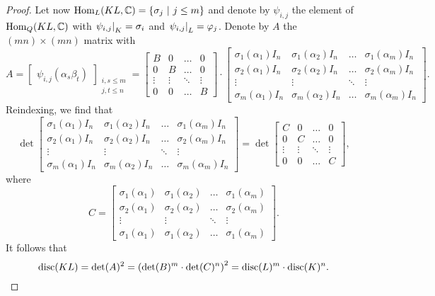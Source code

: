 \begin{proof}
Let now $\operatorname{Hom}_L(KL, \mathbb{C}) = \left\{\sigma_j~\middle\vert~j \leq m\right\}$ and denote
by $\psi_{i,j}$ the element of $\operatorname{Hom}_Q(KL, \mathbb{C})$ with
$\left. \psi_{i,j}\right|_{K}^{} = \sigma_i$ and
$\left. \psi_{i,j}\right|_{L}^{} = \varphi_j$. Denote by $A$ the
$(mn) \times (mn)$ matrix with
\[
A =
\begin{bmatrix}
\psi_{i,j}(\alpha_s \beta_t)
\end{bmatrix}_{\substack{i,s \leq m \\ j,t \leq n}}
=
\begin{bmatrix}
B & 0 & \dots & 0 \\
0 & B & \dots & 0 \\
\vdots & \vdots & \ddots & \vdots \\
0 & 0 & \dots & B
\end{bmatrix}
\cdot
\begin{bmatrix}
\sigma_1(\alpha_1) I_n & \sigma_1(\alpha_2) I_n &
\dots & \sigma_1(\alpha_m) I_n \\
\sigma_2(\alpha_1) I_n & \sigma_2(\alpha_2) I_n &
\dots & \sigma_2(\alpha_m) I_n \\
\vdots & \vdots & \ddots & \vdots \\
\sigma_m(\alpha_1) I_n & \sigma_m(\alpha_2) I_n &
\dots & \sigma_m(\alpha_m) I_n
\end{bmatrix}.
\]
Reindexing, we find that
\[
\det \begin{bmatrix}
\sigma_1(\alpha_1) I_n & \sigma_1(\alpha_2) I_n &
\dots & \sigma_1(\alpha_m) I_n \\
\sigma_2(\alpha_1) I_n & \sigma_2(\alpha_2) I_n &
\dots & \sigma_2(\alpha_m) I_n \\
\vdots & \vdots & \ddots & \vdots \\
\sigma_m(\alpha_1) I_n & \sigma_m(\alpha_2) I_n &
\dots & \sigma_m(\alpha_m) I_n
\end{bmatrix}
=
\det \begin{bmatrix}
C & 0 & \dots & 0 \\
0 & C & \dots & 0 \\
\vdots & \vdots & \ddots & \vdots \\
0 & 0 & \dots & C
\end{bmatrix},
\]
where
\[
C =
\begin{bmatrix}
\sigma_1(\alpha_1) & \sigma_1(\alpha_2) &
\dots & \sigma_1(\alpha_m) \\
\sigma_2(\alpha_1) & \sigma_2(\alpha_2) &
\dots & \sigma_2(\alpha_m) \\
\vdots & \vdots & \ddots & \vdots \\
\sigma_1(\alpha_1) & \sigma_1(\alpha_2) &
\dots & \sigma_1(\alpha_m)
\end{bmatrix}.
\]
It follows that
\[
\operatorname{disc}(KL) =
\det(A)^2 =
\left(\det(B)^m \cdot \det(C)^n\right)^2 =
\operatorname{disc}(L)^m \cdot \operatorname{disc}(K)^n. \qedhere
\]
\end{proof}

